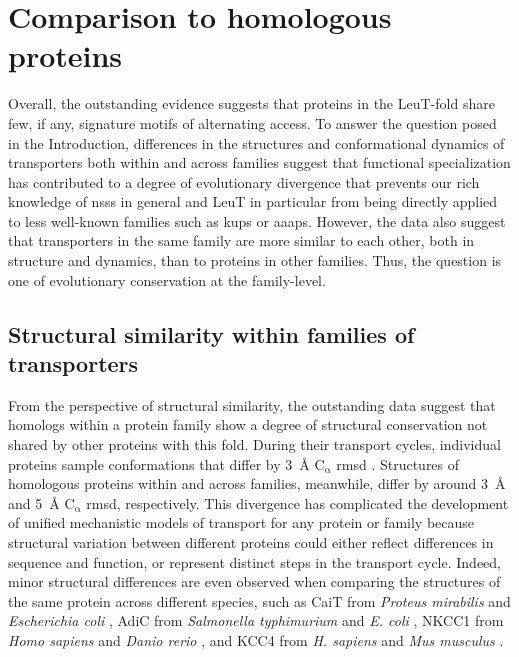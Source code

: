 \section{Comparison to homologous proteins}\label{sec:leutintro_homologs}

Overall, the outstanding evidence suggests that proteins in the LeuT-fold share few, if any, signature motifs of alternating access. To answer the question posed in the Introduction, differences in the structures and conformational dynamics of transporters both within and across families suggest that functional specialization has contributed to a degree of evolutionary divergence that prevents our rich knowledge of \gls{nss}s in general and LeuT in particular from being directly applied to less well-known families such as \gls{kup}s or \gls{aaap}s. However, the data also suggest that transporters in the same family are more similar to each other, both in structure and dynamics, than to proteins in other families. Thus, the question is one of evolutionary conservation at the family-level.

\subsection{Structural similarity within families of transporters}

From the perspective of structural similarity, the outstanding data suggest that homologs within a protein family show a degree of structural conservation not shared by other proteins with this fold. During their transport cycles, individual proteins sample conformations that differ by \SI{3}{\angstrom} $\mathrm{C_{\upalpha}}$ \gls{rmsd} \citep*{Ponzoni2018}. Structures of homologous proteins within and across families, meanwhile, differ by around \SI{3}{\angstrom} and \SI{5}{\angstrom} $\mathrm{C_{\upalpha}}$ \gls{rmsd}, respectively. This divergence has complicated the development of unified mechanistic models of transport for any protein or family because structural variation between different proteins could either reflect differences in sequence and function, or represent distinct steps in the transport cycle. Indeed, minor structural differences are even observed when comparing the structures of the same protein across different species, such as CaiT from \emph{Proteus mirabilis} and \emph{Escherichia coli} \citep*{Schulze2010}, AdiC from \emph{Salmonella typhimurium} and \emph{E. coli} \citep*{Fang2009}, NKCC1 from \emph{Homo sapiens} \citep*{Yang2020, Zhang2021a} and \emph{Danio rerio} \citep*{Chew2019}, and KCC4 from \emph{H. sapiens} \citep*{Xie2020} and \emph{Mus musculus} \citep*{Reid2020}.

